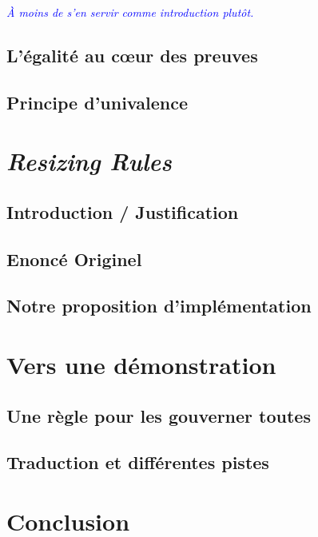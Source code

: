 \documentclass[11pt]{article}
\newcommand\meta[1]{\noindent\textcolor{blue}{\emph{#1}}}
\begin{document}
\meta{À moins de s'en servir comme introduction plutôt.}

\subsection{L'égalité au cœur des preuves}

\subsection{Principe d'univalence}

\section{\emph{Resizing Rules}}

\subsection{Introduction / Justification}

\subsection{Enoncé Originel}

\subsection{Notre proposition d'implémentation}

\section{Vers une démonstration}

\subsection{Une règle pour les gouverner toutes}

\subsection{Traduction et différentes pistes}

\section{Conclusion}
\end{document}
